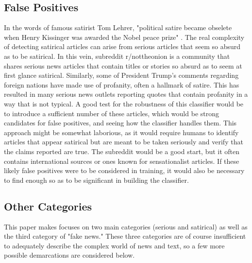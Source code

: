 \documentclass [12 pt] {report}
\begin{document}
\subsection{False Positives}
In the words of famous satirist Tom Lehrer, "political satire became obselete when Henry Kissinger was awarded the Nobel peace prize" \cite{Purdom}. The real complexity of detecting satirical articles can arise from serious articles that seem so absurd as to be satirical. In this vein, subreddit r/nottheonion is a community that shares serious news articles that contain titles or stories so absurd as to seem at first glance satirical. Similarly, some of President Trump's comments regarding foreign nations have made use of profanity, often a hallmark of satire. This has resulted in many serious news outlets reporting quotes that contain profanity in a way that is not typical. A good test for the robustness of this classifier would be to introduce a sufficient number of these articles, which would be strong candidates for false positives, and seeing how the classifier handles them. This approach might be somewhat laborious, as it would require humans to identify articles that appear satirical but are meant to be taken seriously and verify that the claims reported are true. The subreddit would be a good start, but it often contains international sources or ones known for sensationalist articles. If these likely false positives were to be considered in training, it would also be necessary to find enough so as to be significant in building the classifier.
\subsection{Other Categories}
This paper makes focuses on two main categories (serious and satirical) as well as the third category of "fake news." These three categories are of course insufficient to adequately describe the complex world of news and text, so a few more possible demarcations are considered below.
\end{document}
